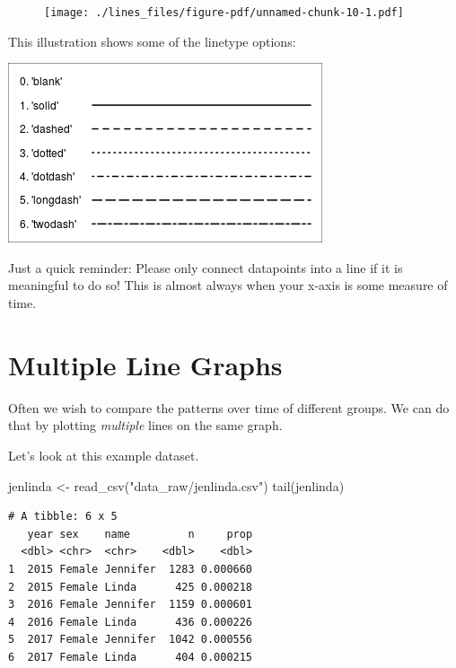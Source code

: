 \documentclass[
  letterpaper,
  DIV=11,
  numbers=noendperiod]{scrreprt}
\newenvironment{Shaded}{\begin{snugshade}}{\end{snugshade}}
\newcommand{\FunctionTok}[1]{\textcolor[rgb]{0.28,0.35,0.67}{#1}}
\newcommand{\NormalTok}[1]{\textcolor[rgb]{0.00,0.23,0.31}{#1}}
\newcommand{\OtherTok}[1]{\textcolor[rgb]{0.00,0.23,0.31}{#1}}
\newcommand{\StringTok}[1]{\textcolor[rgb]{0.13,0.47,0.30}{#1}}
\begin{document}
\begin{figure}[H]

{\centering \texttt{[image: ./lines\_files/figure-pdf/unnamed-chunk-10-1.pdf]}

}

\end{figure}

This illustration shows some of the linetype options:

\includegraphics{./img/lty.png}

Just a quick reminder: Please only connect datapoints into a line if it
is meaningful to do so! This is almost always when your x-axis is some
measure of time.

\hypertarget{multiple-line-graphs}{%
\section{Multiple Line Graphs}\label{multiple-line-graphs}}

Often we wish to compare the patterns over time of different groups. We
can do that by plotting \emph{multiple} lines on the same graph.

Let's look at this example dataset.

\begin{Shaded}
\begin{Highlighting}[]
\NormalTok{jenlinda }\OtherTok{\textless{}{-}} \FunctionTok{read\_csv}\NormalTok{(}\StringTok{"data\_raw/jenlinda.csv"}\NormalTok{)}
\FunctionTok{tail}\NormalTok{(jenlinda)}
\end{Highlighting}
\end{Shaded}

\begin{verbatim}
# A tibble: 6 x 5
   year sex    name         n     prop
  <dbl> <chr>  <chr>    <dbl>    <dbl>
1  2015 Female Jennifer  1283 0.000660
2  2015 Female Linda      425 0.000218
3  2016 Female Jennifer  1159 0.000601
4  2016 Female Linda      436 0.000226
5  2017 Female Jennifer  1042 0.000556
6  2017 Female Linda      404 0.000215
\end{verbatim}
\end{document}
